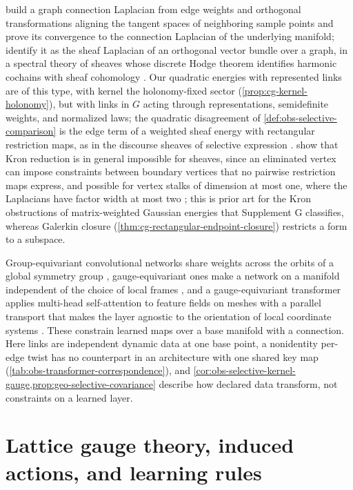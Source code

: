 \citet[Section 3 and Theorem 5.1]{SingerWu2012} build a graph connection
Laplacian from edge weights and orthogonal transformations aligning the tangent
spaces of neighboring sample points and prove its convergence to the connection
Laplacian of the underlying manifold; \citet[Section 3.6]{HansenGhrist2019}
identify it as the sheaf Laplacian of an orthogonal vector bundle over a graph,
in a spectral theory of sheaves whose discrete Hodge theorem identifies harmonic
cochains with sheaf cohomology \citep[Theorem 3.1]{HansenGhrist2019}. Our
quadratic energies with represented links are of this type, with
kernel the holonomy-fixed sector (\cref{prop:cg-kernel-holonomy}), but with
links in \(G\) acting through representations, semidefinite weights, and
normalized laws; the quadratic disagreement of
\cref{def:obs-selective-comparison} is the edge term of a weighted sheaf energy
with rectangular restriction maps, as in the discourse sheaves of selective
expression \citep{HansenGhrist2021Discourse}.
\citet[Section 4.2]{HansenGhrist2019} show that Kron reduction is in general
impossible for sheaves, since an eliminated vertex can impose constraints
between boundary vertices that no pairwise restriction maps express, and
possible for vertex stalks of dimension at most one, where the Laplacians have
factor width at most two \citep[Theorem 4.3]{HansenGhrist2019}; this is prior
art for the Kron obstructions of matrix-weighted Gaussian energies that
Supplement G classifies, whereas Galerkin closure
(\cref{thm:cg-rectangular-endpoint-closure}) restricts a form to a subspace.

Group-equivariant convolutional networks share weights across the orbits of a
global symmetry group \citep{Cohen2016}, gauge-equivariant ones make a network
on a manifold independent of the choice of local frames \citep{cohen2019gauge},
and a gauge-equivariant transformer applies multi-head self-attention to feature
fields on meshes with a parallel transport that makes the layer agnostic to the
orientation of local coordinate systems \citep{He2021GaugeEquivariantTransformer}.
These constrain learned maps over a base manifold with a connection. Here links
are independent dynamic data at one base point, a nonidentity per-edge twist has
no counterpart in an architecture with one shared key map
(\cref{tab:obs-transformer-correspondence}), and
\cref{cor:obs-selective-kernel-gauge,prop:geo-selective-covariance} describe how
declared data transform, not constraints on a learned layer.

\section{Lattice gauge theory, induced actions, and learning rules}
\label{sec:links-related-work}

